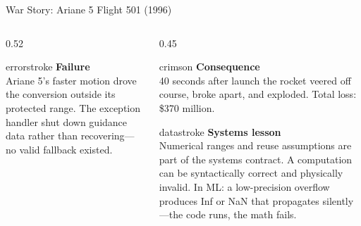 \documentclass[aspectratio=169, 12pt]{beamer}
\begin{document}
\begin{frame}{War Story: Ariane 5 Flight 501 (1996)}
\begin{columns}[T]
\begin{column}{0.52\textwidth}
    \vspace{0.08cm}
    \begin{mlsyscard}{errorstroke}
    \textbf{Failure}\\[0.03cm]
    {\scriptsize Ariane 5's faster motion drove the conversion outside its protected
    range. The exception handler shut down guidance data rather than
    recovering---no valid fallback existed.}
    \end{mlsyscard}
  \end{column}
  \begin{column}{0.45\textwidth}
    \begin{mlsyscard}{crimson}
    \textbf{Consequence}\\[0.03cm]
    {\scriptsize 40 seconds after launch the rocket veered off course,
    broke apart, and exploded. Total loss: \$370 million.}
    \end{mlsyscard}

    \vspace{0.08cm}
    \begin{mlsyscard}{datastroke}
    \textbf{Systems lesson}\\[0.03cm]
    {\scriptsize Numerical ranges and reuse assumptions are part of the
    systems contract. A computation can be syntactically correct and physically
    invalid. In ML: a low-precision overflow produces Inf or NaN that
    propagates silently---the code runs, the math fails.}
    \end{mlsyscard}
  \end{column}
\end{columns}

\end{frame}
\end{document}
